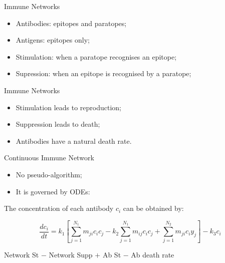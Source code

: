 \documentclass[xcolor=svgnames]{beamer}
\begin{document}
    \begin{frame}{Immune Networks}
        \begin{itemize}
            \item Antibodies: epitopes and paratopes;
            \item Antigens: epitopes only;
            \item Stimulation: when a paratope recognises an epitope;
            \item Supression: when an epitope is recognised by a paratope;
        \end{itemize}
    \end{frame}
    
    \begin{frame}{Immune Networks}
        \begin{itemize}
            \item Stimulation leads to reproduction;
            \item Suppression leads to death;
            \item Antibodies have a natural death rate.
        \end{itemize}
    \end{frame}    
    
    \begin{frame}{Continuous Immune Network}
        \begin{itemize}
            \item No pseudo-algorithm;
            \item It is governed by ODEs:
        \end{itemize}
        
        The concentration of each antibody $c_{i}$ can be obtained by:
        
        $$ \frac{dc_{i}}{dt} = k_{1} \left[ \sum^{N_{1}}_{j=1}{m_{ji}c_{i}c_{j}} - k_{2} \sum^{N_{1}}_{j=1}{m_{ij}c_{i}c_{j}} + \sum^{N_{2}}_{j=1}{m_{ji}c_{i}y_{j}} \right] - k_{3}c_{i} $$
        
        \center Network St $-$ Network Supp $+$ Ab St $-$ Ab death rate
        
    \end{frame}
    
\end{document}
